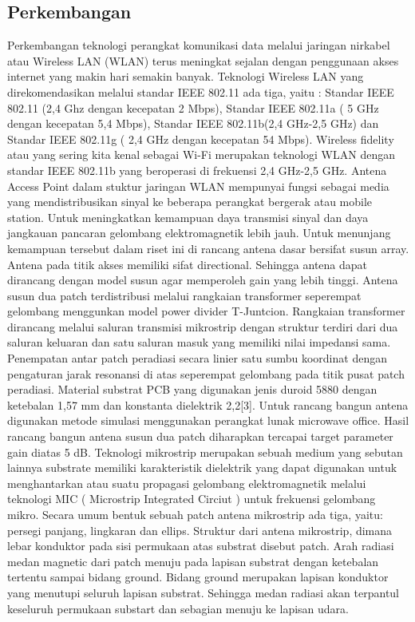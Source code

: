 \subsection {Perkembangan}
Perkembangan teknologi perangkat komunikasi data melalui jaringan nirkabel atau Wireless LAN (WLAN) terus meningkat sejalan dengan penggunaan akses internet yang makin hari semakin banyak. Teknologi Wireless LAN yang direkomendasikan melalui standar IEEE 802.11 ada tiga, yaitu : Standar IEEE 802.11 (2,4 Ghz dengan kecepatan 2 Mbps), Standar IEEE 802.11a ( 5 GHz dengan kecepatan 5,4 Mbps), Standar IEEE 802.11b(2,4 GHz-2,5 GHz) dan Standar IEEE 802.11g ( 2,4 GHz dengan kecepatan 54 Mbps). Wireless fidelity atau yang sering kita kenal sebagai Wi-Fi merupakan teknologi WLAN dengan standar IEEE 802.11b yang beroperasi di frekuensi 2,4 GHz-2,5 GHz. Antena Access Point dalam stuktur jaringan WLAN mempunyai fungsi sebagai media yang mendistribusikan sinyal ke beberapa perangkat bergerak atau mobile station. Untuk meningkatkan kemampuan daya transmisi sinyal dan daya jangkauan pancaran gelombang elektromagnetik lebih jauh.   Untuk menunjang kemampuan tersebut dalam riset ini di rancang antena dasar bersifat susun array. Antena pada titik akses memiliki sifat directional. Sehingga antena dapat dirancang dengan model susun agar memperoleh gain yang lebih tinggi.  Antena susun dua patch terdistribusi melalui rangkaian transformer seperempat gelombang menggunkan model power divider T-Juntcion. Rangkaian transformer dirancang melalui saluran transmisi mikrostrip dengan struktur terdiri dari dua saluran keluaran dan satu saluran masuk yang memiliki nilai impedansi sama. Penempatan antar patch peradiasi secara linier satu sumbu koordinat dengan pengaturan jarak resonansi di atas seperempat gelombang pada titik pusat patch peradiasi. Material substrat PCB yang digunakan jenis duroid 5880 dengan ketebalan 1,57 mm dan konstanta dielektrik 2,2[3]. Untuk rancang bangun antena digunakan metode simulasi menggunakan perangkat lunak microwave office. Hasil rancang bangun antena susun dua patch diharapkan tercapai target parameter gain diatas 5 dB.  Teknologi mikrostrip merupakan sebuah medium yang sebutan lainnya substrate memiliki karakteristik dielektrik yang dapat digunakan untuk menghantarkan atau suatu propagasi gelombang elektromagnetik melalui teknologi MIC ( Microstrip Integrated Circiut ) untuk frekuensi gelombang mikro. Secara umum bentuk sebuah patch antena mikrostrip ada tiga, yaitu: persegi panjang, lingkaran dan ellips. Struktur dari antena mikrostrip, dimana lebar konduktor pada sisi permukaan atas substrat disebut patch.   Arah radiasi medan magnetic dari patch menuju pada lapisan substrat dengan ketebalan tertentu sampai bidang ground. Bidang ground merupakan lapisan konduktor yang menutupi seluruh lapisan substrat. Sehingga medan radiasi akan terpantul keseluruh permukaan substart dan sebagian menuju ke lapisan udara. 